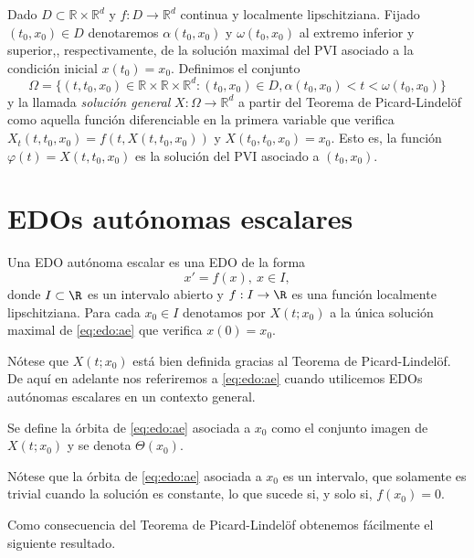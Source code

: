 \documentclass{article}
\begin{document}
Dado $D \subset \mathbb{R} \times \mathbb{R}^d$ y $f : D \to \mathbb{R}^d$ continua y localmente lipschitziana. Fijado $(t_0, x_0) \in D$ denotaremos $\alpha(t_0, x_0)$ y $\omega(t_0, x_0)$ al extremo inferior y superior,, respectivamente, de la solución maximal del PVI asociado a la condición inicial $x(t_0) = x_0$. Definimos el conjunto
\[\Omega = \{(t, t_0, x_0) \in \mathbb{R}\times\mathbb{R}\times\mathbb{R}^d : (t_0, x_0) \in D, \alpha(t_0, x_0) < t < \omega(t_0, x_0)\}\]
y la llamada \emph{solución general} $X: \Omega \to \mathbb{R}^d$ a partir del Teorema de Picard-Lindelöf como aquella función diferenciable en la primera variable que verifica $X_t(t, t_0, x_0) = f(t, X(t, t_0, x_0))$ y $X(t_0, t_0, x_0) = x_0$. Esto es, la función $\varphi(t) = X(t, t_0, x_0)$ es la solución del PVI asociado a $(t_0, x_0)$.

\section{EDOs autónomas escalares}

\begin{definition}
Una EDO autónoma escalar es una EDO de la forma
\begin{equation}
  \label{eq:edo:ae}
  x' = f(x), \ x \in I,
  \tag{AE}
\end{equation}
donde $I \subset \R$ es un intervalo abierto y $f : I \to \R$ es una función localmente
lipschitziana. Para cada $x_0 \in I$ denotamos por $X(t; x_0)$ a la única solución maximal de
\eqref{eq:edo:ae} que verifica $x(0) = x_0$. 
\end{definition}

Nótese que $X(t; x_0)$ está bien definida gracias al Teorema de Picard-Lindelöf. De aquí en adelante nos referiremos a \eqref{eq:edo:ae} cuando utilicemos EDOs autónomas escalares en un contexto general.

\begin{definition}
  Se define la órbita de \eqref{eq:edo:ae} asociada a $x_0$ como el conjunto imagen de $X(t; x_0)$ y
  se denota $\Theta(x_0)$.
\end{definition}

Nótese que la órbita de \eqref{eq:edo:ae} asociada a $x_0$ es un intervalo, que solamente es trivial
cuando la solución es constante, lo que sucede si, y solo si, $f(x_0) = 0$.

Como consecuencia del Teorema de Picard-Lindelöf obtenemos fácilmente el siguiente resultado.
\end{document}
